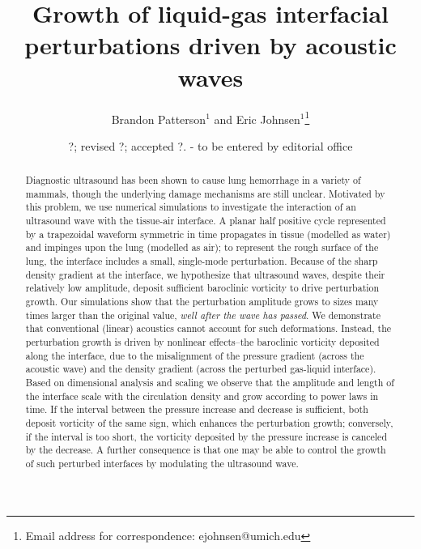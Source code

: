 \documentclass{jfm}%
\title[]{Growth of liquid-gas interfacial perturbations driven by acoustic waves}
\author[B. Patterson and E. Johnsen]%
{Brandon Patterson$^1$ and %
  Eric Johnsen$^1$\thanks{Email address for correspondence: ejohnsen@umich.edu}\ns
}
\affiliation{$^1$Department of Mechanical Engineering, University of Michigan,
  Ann Arbor, MI 48109, USA}
\date{?; revised ?; accepted ?. - to be entered by editorial office}
\begin{document}
\maketitle

\begin{acronym}
\end{acronym}

\begin{abstract}
  Diagnostic ultrasound has been shown to cause lung hemorrhage in a
  variety of mammals, though the underlying damage mechanisms are
  still unclear. Motivated by this problem, we use numerical
  simulations to investigate the interaction of an ultrasound wave
  with the tissue-air interface. A planar half positive cycle
  represented by a trapezoidal waveform symmetric in time propagates
  in tissue (modelled as water) and impinges upon the lung (modelled
  as air); to represent the rough surface of the lung, the interface
  includes a small, single-mode perturbation. Because of the sharp
  density gradient at the interface, we hypothesize that ultrasound
  waves, despite their relatively low amplitude, deposit sufficient
  baroclinic vorticity to drive perturbation growth. Our simulations
  show that the perturbation amplitude grows to sizes many times
  larger than the original value, \emph{well after the wave has
    passed}. We demonstrate that conventional (linear) acoustics
  cannot account for such deformations. Instead, the perturbation
  growth is driven by nonlinear effects--the baroclinic vorticity
  deposited along the interface, due to the misalignment of the
  pressure gradient (across the acoustic wave) and the density
  gradient (across the perturbed gas-liquid interface). Based on
  dimensional analysis and scaling we observe that the amplitude and
  length of the interface scale with the circulation density and grow
  according to power laws in time. If the interval between the
  pressure increase and decrease is sufficient, both deposit vorticity
  of the same sign, which enhances the perturbation
  growth; conversely, if the interval is too short, the vorticity
  deposited by the pressure increase is canceled by the decrease. A
  further consequence is that one may be able to control the growth of
  such perturbed interfaces by modulating the ultrasound wave.
\end{abstract}
\end{document}
